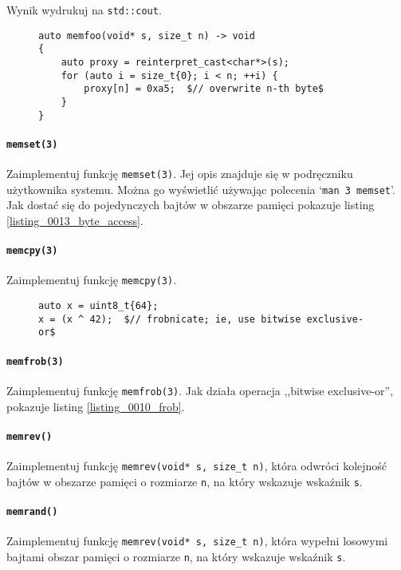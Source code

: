 \documentclass[11pt,a4paper,titlepage,onecolumn]{article}
\begin{document}
Wynik wydrukuj na \texttt{std::cout}.

\begin{figure}[!htp]
\begin{lstlisting}[caption={dostęp do pojedynczych bajtów},
    captionpos=b,
    label=listing_0013_byte_access]
auto memfoo(void* s, size_t n) -> void
{
    auto proxy = reinterpret_cast<char*>(s);
    for (auto i = size_t{0}; i < n; ++i) {
        proxy[n] = 0xa5;  $// overwrite n-th byte$
    }
}
\end{lstlisting}
\end{figure}

\paragraph{\texttt{memset(3)}} Zaimplementuj funkcję \texttt{memset(3)}. Jej
opis znajduje się w podręczniku użytkownika systemu. Można go wyświetlić
używając polecenia `\texttt{man 3 memset}'. Jak dostać się do pojedynczych
bajtów w obszarze pamięci pokazuje listing \ref{listing_0013_byte_access}.

\paragraph{\texttt{memcpy(3)}} Zaimplementuj funkcję \texttt{memcpy(3)}.

\begin{figure}[!htp]
\begin{lstlisting}[caption={frobnicate},
    captionpos=b,
    label=listing_0010_frob]
auto x = uint8_t{64};
x = (x ^ 42);  $// frobnicate; ie, use bitwise exclusive-or$
\end{lstlisting}
\end{figure}

\paragraph{\texttt{memfrob(3)}} Zaimplementuj funkcję \texttt{memfrob(3)}. Jak
działa operacja ,,bitwise exclusive-or'', pokazuje listing
\ref{listing_0010_frob}.

\paragraph{\texttt{memrev()}} Zaimplementuj funkcję \texttt{memrev(void* s,
size\_t n)}, która odwróci kolejność bajtów w obszarze pamięci o rozmiarze
\texttt{n}, na który wskazuje wskaźnik \texttt{s}.

\paragraph{\texttt{memrand()}} Zaimplementuj funkcję \texttt{memrev(void* s,
size\_t n)}, która wypełni losowymi bajtami obszar pamięci o rozmiarze
\texttt{n}, na który wskazuje wskaźnik \texttt{s}.
\end{document}

